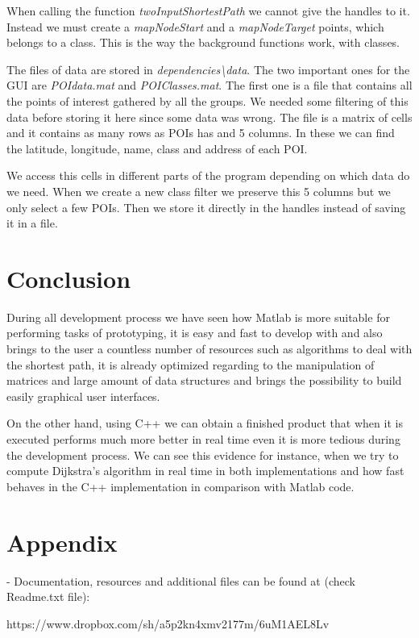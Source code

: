 \documentclass{article}
\begin{document}
When calling the function \textit{twoInputShortestPath} we cannot give the handles to it. Instead we must create a \textit{mapNodeStart} and a \textit{mapNodeTarget} points, which belongs to a class. This is the way the background functions work, with classes.

The files of data are stored in \textit{dependencies\textbackslash data}. The two important ones for the GUI are \textit{POIdata.mat} and \textit{POIClasses.mat}. The first one is a file that contains all the points of interest gathered by all the groups. We needed some filtering of this data before storing it here since some data was wrong. The file is a matrix of cells and it contains as many rows as POIs has and 5 columns. In these we can find the latitude, longitude, name, class and address of each POI.

We access this cells in different parts of the program depending on which data do we need. When we create a new class filter we preserve this 5 columns but we only select a few POIs. Then we store it directly in the handles instead of saving it in a file.

\clearpage
\section{Conclusion}
During all development process we have seen how Matlab is more suitable for performing tasks of prototyping, it is easy and fast to develop with and also brings to the user a countless number of resources such as algorithms to deal with the shortest path, it is already optimized regarding to the manipulation of matrices and large amount of data structures and brings the possibility to build easily graphical user interfaces.

On the other hand, using C++ we can obtain a finished product that when it is executed performs much more better in real time even it is more tedious during the development process. We can see this evidence for instance, when we try to compute Dijkstra's algorithm in real time in both implementations and how fast behaves in the C++ implementation in comparison with Matlab code. 

\clearpage
\section{Appendix}

- Documentation, resources and additional files can be found at (check Readme.txt file): 

https://www.dropbox.com/sh/a5p2kn4xmv2177m/6uM1AEL8Lv
\end{document}
